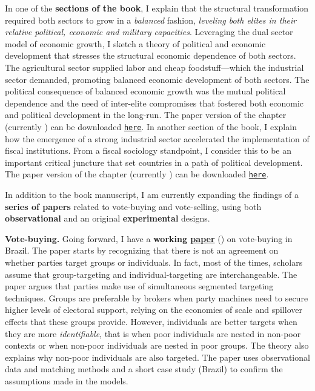 \documentclass[10pt,stdletter,dateno,sigleft]{newlfm} %
\begin{document}
\begin{newlfm}
In one of the {\bf sections of the book}, I explain that the structural transformation required both sectors to grow in a \emph{balanced} fashion, \emph{leveling both elites in their relative political, economic and military capacities}. Leveraging the dual sector model of economic growth, I sketch a theory of political and economic development that stresses the structural economic dependence of both sectors. The agricultural sector supplied labor and cheap foodstuff---which the industrial sector demanded, promoting balanced economic development of both sectors. The political consequence of balanced economic growth was the mutual political dependence and the need of inter-elite compromises that fostered both economic and political development in the long-run. The paper version of the chapter (currently \emph{\unskip}) can be downloaded \href{https://github.com/hbahamonde/Negative_Link_Paper/raw/master/Bahamonde_NegativeLink.pdf}{\texttt{here}}. In another section of the book, I explain how the emergence of a strong industrial sector accelerated the implementation of fiscal institutions. From a fiscal sociology standpoint, I consider this to be an important critical juncture that set countries in a path of political development. The paper version of the chapter (currently \emph{\unskip}) can be downloaded \href{http://github.com/hbahamonde/IncomeTaxAdoption/raw/master/Bahamonde_IncomeTaxAdoption.pdf}{\texttt{here}}. 


In addition to the book manuscript, I am currently expanding the findings of a {\bf series of papers} related to vote-buying and vote-selling, using both {\bf observational} and an original {\bf experimental} designs.



{\bf Vote-buying.} Going forward, I have a {\bf working \href{https://github.com/hbahamonde/Clientelism_paper/raw/master/Bahamonde_Clientelism_Paper.pdf}{paper}} (\emph{\unskip}) on vote-buying in Brazil. The paper starts by recognizing that there is not an agreement on whether parties target groups or individuals. In fact, most of the times, scholars assume that group-targeting and individual-targeting are interchangeable. The paper argues that parties make use of simultaneous segmented targeting techniques. Groups are preferable by brokers when party machines need to secure higher levels of electoral support, relying on the economies of scale and spillover effects that these groups provide. However, individuals are better targets when they are more \emph{identifiable}, that is when poor individuals are nested in non-poor contexts or when non-poor individuals are nested in poor groups. The theory also explains why non-poor individuals are also targeted. The paper uses observational data and matching methods and a short case study (Brazil) to confirm the assumptions made in the models.


\end{newlfm}
\end{document}
